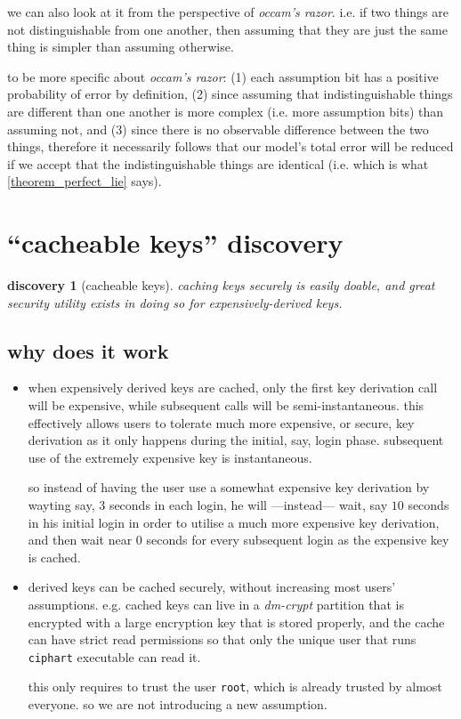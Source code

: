\documentclass[twocolumn]{article}
\newtheorem{discovery}{discovery}
\begin{document}
we can also look at it from the perspective of \emph{occam's razor}.  i.e.
if two things are not distinguishable from one another, then assuming that
they are just the same thing is simpler than assuming otherwise.  

to be more specific about \emph{occam's razor}: (1) each assumption bit has
a positive probability of error by definition, (2) since assuming that
indistinguishable things are different than one another is more complex
(i.e. more assumption bits) than assuming not, and (3) since there is no
observable difference between the two things, therefore it necessarily
follows that our model's total error will be reduced if we accept that the
indistinguishable things are identical (i.e.  which is what
\cref{theorem_perfect_lie} says).

\section{``cacheable keys'' discovery}
\begin{discovery}[cacheable keys]\label{discov_key_caching}
    caching keys securely is easily doable, and great security utility
    exists in doing so for expensively-derived keys.
\end{discovery}

\subsection{why does it work}
\begin{itemize}
    \item when expensively derived keys are cached, only the first key
    derivation call will be expensive, while subsequent calls will be
    semi-instantaneous.  this effectively allows users to tolerate much
    more expensive, or secure, key derivation as it only happens during the
    initial, say, login phase.  subsequent use of the extremely expensive
    key is instantaneous.

    so instead of having the user use a somewhat expensive key derivation
    by wayting say, $3$ seconds in each login, he will ---instead--- wait,
    say $10$ seconds in his initial login in order to utilise a much more
    expensive key derivation, and then wait near $0$ seconds for every
    subsequent login as the expensive key is cached.

    \item derived keys can be cached securely, without increasing most
    users' assumptions.  e.g. cached keys can live in a \emph{dm-crypt}
    partition that is encrypted with a large encryption key that is stored
    properly, and the cache can have strict read permissions so that only
    the unique user that runs \texttt{ciphart} executable can read it.

    this only requires to trust the user \texttt{root}, which is already
    trusted by almost everyone.  so we are not introducing a new
    assumption.  
\end{itemize}
\end{document}
